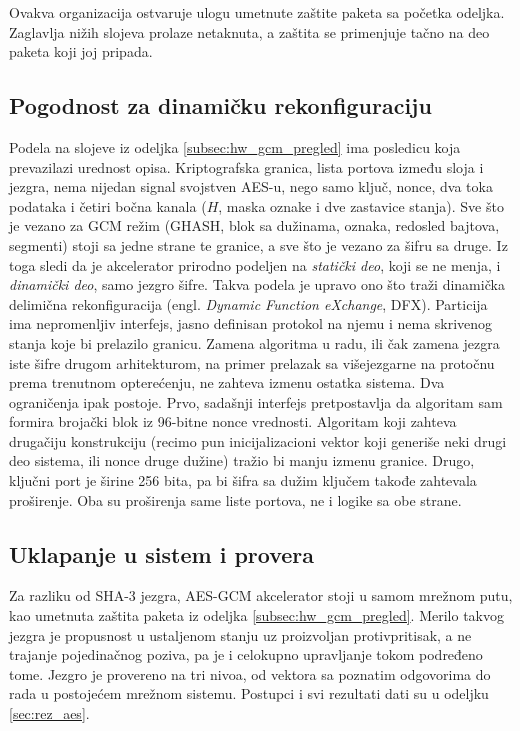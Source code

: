 Ovakva organizacija ostvaruje ulogu umetnute zaštite paketa sa početka odeljka. Zaglavlja nižih slojeva prolaze netaknuta, a zaštita se primenjuje tačno na deo paketa koji joj pripada.

\subsection{Pogodnost za dinamičku rekonfiguraciju}
\label{subsec:hw_dfx}

Podela na slojeve iz odeljka \ref{subsec:hw_gcm_pregled} ima posledicu koja prevazilazi urednost opisa. Kriptografska granica, lista portova između sloja i jezgra, nema nijedan signal svojstven AES-u, nego samo ključ, nonce, dva toka podataka i četiri bočna kanala ($H$, maska oznake i dve zastavice stanja). Sve što je vezano za GCM režim (GHASH, blok sa dužinama, oznaka, redosled bajtova, segmenti) stoji sa jedne strane te granice, a sve što je vezano za šifru sa druge.
\smallbreak
Iz toga sledi da je akcelerator prirodno podeljen na \textit{statički deo}, koji se ne menja, i \textit{dinamički deo}, samo jezgro šifre. Takva podela je upravo ono što traži dinamička delimična rekonfiguracija (engl. \textit{Dynamic Function eXchange}, DFX). Particija ima nepromenljiv interfejs, jasno definisan protokol na njemu i nema skrivenog stanja koje bi prelazilo granicu. Zamena algoritma u radu, ili čak zamena jezgra iste šifre drugom arhitekturom, na primer prelazak sa višejezgarne na protočnu prema trenutnom opterećenju, ne zahteva izmenu ostatka sistema.
\smallbreak
Dva ograničenja ipak postoje. Prvo, sadašnji interfejs pretpostavlja da algoritam sam formira brojački blok iz 96-bitne nonce vrednosti. Algoritam koji zahteva drugačiju konstrukciju (recimo pun inicijalizacioni vektor koji generiše neki drugi deo sistema, ili nonce druge dužine) tražio bi manju izmenu granice. Drugo, ključni port je širine 256 bita, pa bi šifra sa dužim ključem takođe zahtevala proširenje. Oba su proširenja same liste portova, ne i logike sa obe strane.

\subsection{Uklapanje u sistem i provera}
\label{subsec:hw_aes_uklapanje}

Za razliku od SHA-3 jezgra, AES-GCM akcelerator stoji u samom mrežnom putu, kao umetnuta zaštita paketa iz odeljka \ref{subsec:hw_gcm_pregled}. Merilo takvog jezgra je propusnost u ustaljenom stanju uz proizvoljan protivpritisak, a ne trajanje pojedinačnog poziva, pa je i celokupno upravljanje tokom podređeno tome.
\smallbreak
Jezgro je provereno na tri nivoa, od vektora sa poznatim odgovorima do rada u postojećem mrežnom sistemu. Postupci i svi rezultati dati su u odeljku \ref{sec:rez_aes}.

